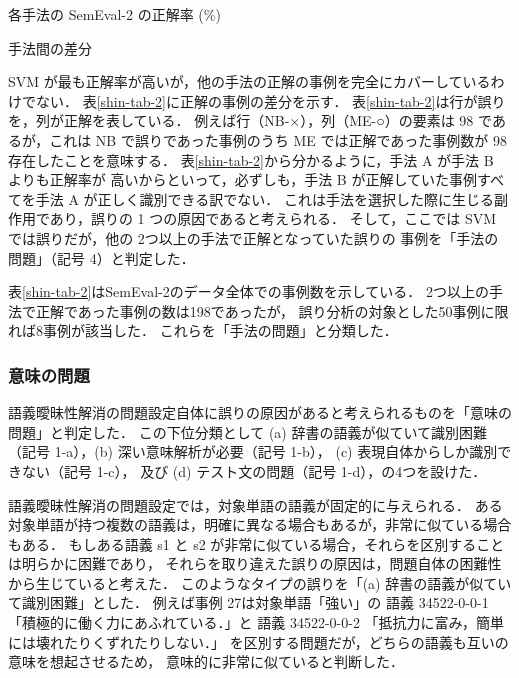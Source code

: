 \documentclass[japanese]{jnlp_1.4}
\begin{document}
\begin{table}[b]
\caption{各手法の SemEval-2 の正解率 (\%)}
\label{shin-tab-1}

\end{table}
\begin{table}[b]
\caption{手法間の差分}
\label{shin-tab-2}

\end{table}

SVM が最も正解率が高いが，他の手法の正解の事例を完全にカバーしているわけでない．
\mbox{表\ref{shin-tab-2}}に正解の事例の差分を示す．
\mbox{表\ref{shin-tab-2}}は行が誤りを，列が正解を表している．
例えば行（\mbox{NB-×}），列（\mbox{ME-○}）の要素は 98 であるが，これは
NB で誤りであった事例のうち ME では正解であった事例数が 98 存在したことを意味する．
\mbox{表\ref{shin-tab-2}}から分かるように，手法 A が手法 B よりも正解率が
高いからといって，必ずしも，手法 B が正解していた事例すべてを手法 A が正しく識別できる訳でない．
これは手法を選択した際に生じる副作用であり，誤りの 1 つの原因であると考えられる．
そして，ここでは SVM では誤りだが，他の 2つ以上の手法で正解となっていた誤りの
事例を「手法の問題」（記号 4）と判定した．

表\ref{shin-tab-2}はSemEval-2のデータ全体での事例数を示している．
2つ以上の手法で正解であった事例の数は198であったが，
誤り分析の対象とした50事例に限れば8事例が該当した．
これらを「手法の問題」と分類した．


\subsubsection{意味の問題}

語義曖昧性解消の問題設定自体に誤りの原因があると考えられるものを「意味の問題」と判定した．
この下位分類として (a) 辞書の語義が似ていて識別困難（記号 1-a），(b) 深い意味解析が必要（記号 1-b），
(c) 表現自体からしか識別できない（記号 1-c），
及び (d) テスト文の問題（記号 1-d），の4つを設けた．

語義曖昧性解消の問題設定では，対象単語の語義が固定的に与えられる．
ある対象単語が持つ複数の語義は，明確に異なる場合もあるが，非常に似ている場合もある．
もしある語義 s1 と s2 が非常に似ている場合，それらを区別することは明らかに困難であり，
それらを取り違えた誤りの原因は，問題自体の困難性から生じていると考えた．
このようなタイプの誤りを「(a) 辞書の語義が似ていて識別困難」とした．
例えば事例 27は対象単語「強い」の
語義 34522-0-0-1 「積極的に働く力にあふれている．」と
語義 34522-0-0-2 「抵抗力に富み，簡単には壊れたりくずれたりしない．」
を区別する問題だが，どちらの語義も互いの意味を想起させるため，
意味的に非常に似ていると判断した．
\end{document}
